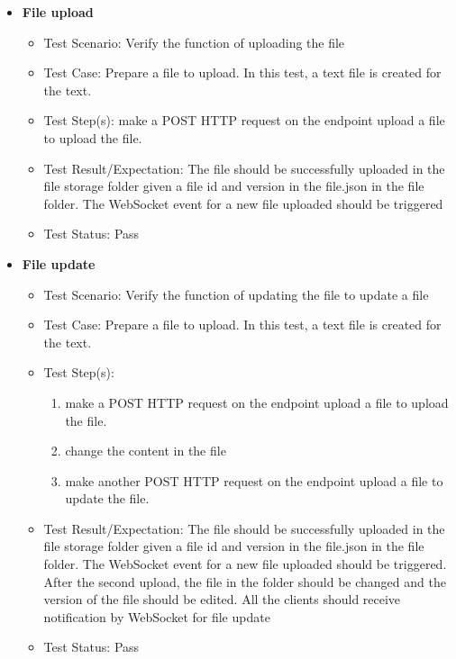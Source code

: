 \documentclass{article}
\begin{document}
\begin{itemize}

\item\textbf{File upload}
    \begin{itemize}
        \item{Test Scenario: Verify the function of uploading the file}
        \item{Test Case: Prepare a file to upload. In this test, a text file is created for the text.}
        \item{Test Step(s): make a POST HTTP request on the endpoint upload a file to upload the file.}
        \item{Test Result/Expectation: The file should be successfully uploaded in the file storage folder given a file id and version in the file.json in the file folder. The WebSocket event for a new file uploaded should be triggered}
        \item{Test Status: Pass}
    \end{itemize}
\item\textbf{File update}
    \begin{itemize}
        \item{Test Scenario: Verify the function of updating the file to update a file}
        \item{Test Case: Prepare a file to upload. In this test, a text file is created for the text.}
        \item{Test Step(s):}
            \begin{enumerate}
                \item{make a POST HTTP request on the endpoint upload a file to upload the file.}
                \item{change the content in the file}
                \item{make another POST HTTP request on the endpoint upload a file to update the file.}
            \end{enumerate}
        \item{Test Result/Expectation: The file should be successfully uploaded in the file storage folder given a file id and version in the file.json in the file folder. The WebSocket event for a new file uploaded should be triggered. After the second upload, the file in the folder should be changed and the version of the file should be edited. All the clients should receive notification by WebSocket for file update}
        \item{Test Status: Pass}
    \end{itemize}

\end{itemize}
\end{document}
